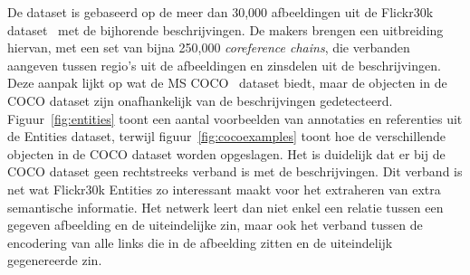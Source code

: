 De dataset is gebaseerd op de meer dan 30,000 afbeeldingen uit de Flickr30k dataset~\cite{Young2014} met de bijhorende beschrijvingen. De makers brengen een uitbreiding hiervan, met een set van bijna 250,000 \emph{coreference chains}, die verbanden aangeven tussen regio's uit de afbeeldingen en zinsdelen uit de beschrijvingen. Deze aanpak lijkt op wat de MS COCO~\cite{Lin2014} dataset biedt, maar de objecten in de COCO dataset zijn onafhankelijk van de beschrijvingen gedetecteerd. Figuur~\ref{fig:entities} toont een aantal voorbeelden van annotaties en referenties uit de Entities dataset, terwijl figuur~\ref{fig:cocoexamples} toont hoe de verschillende objecten in de COCO dataset worden opgeslagen. Het is duidelijk dat er bij de COCO dataset geen rechtstreeks verband is met de beschrijvingen. Dit verband is net wat Flickr30k Entities zo interessant maakt voor het extraheren van extra semantische informatie. Het netwerk leert dan niet enkel een relatie tussen een gegeven afbeelding en de uiteindelijke zin, maar ook het verband tussen de encodering van alle links die in de afbeelding zitten en de uiteindelijk gegenereerde zin.

